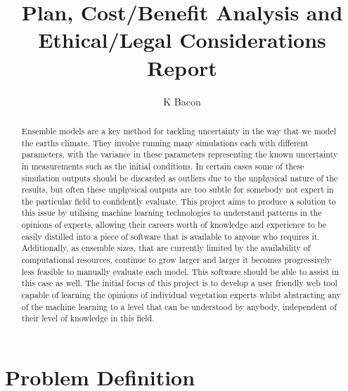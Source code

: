 \documentclass{ecmm427_assignment}
\begin{document}
\tableofcontents

\title{Plan, Cost/Benefit Analysis and Ethical/Legal Considerations Report}
\author{K Bacon}
\maketitle

\begin{abstract}
Ensemble models are a key method for tackling uncertainty in the way that we model the earths climate. They involve running many simulations each with different parameters, with the variance in these parameters representing the known uncertainty in measurements such as the initial conditions. In certain cases some of these simulation outputs should be discarded as outliers due to the unphysical nature of the results, but often these unphysical outputs are too subtle for somebody not expert in the particular field to confidently evaluate. This project aims to produce a solution to this issue by utilising machine learning technologies to understand patterns in the opinions of experts, allowing their careers worth of knowledge and experience to be easily distilled into a piece of software that is available to anyone who requires it. Additionally, as ensemble sizes, that are currently limited by the availability of computational resources, continue to grow larger and larger it becomes progressively less feasible to manually evaluate each model. This software should be able to assist in this case as well. The initial focus of this project is to develop a user friendly web tool capable of learning the opinions of individual vegetation experts whilst abstracting any of the machine learning to a level that can be understood by anybody, independent of their level of knowledge in this field. 
\end{abstract}

\declaration
\newpage %

\section{Problem Definition}
\end{document}
